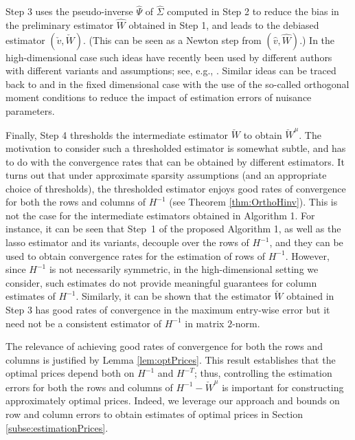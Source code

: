 \documentclass[opre,nonblindrev]{informs3} %
\begin{document}
{Step 3 uses the pseudo-inverse $\hat \Psi$ of $\hat\Sigma$ computed in Step 2 to reduce the bias in the preliminary estimator $\hat W$ obtained in Step 1, and leads to the debiased estimator $(\check v,\check W)$. (This can be seen as a Newton step from $(\hat v,\hat W)$.)  In the high-dimensional case such ideas have recently been  used by different authors with different variants and assumptions; see, e.g., \cite{BelloniChernozhukovHansen2011,c.h.zhang:s.zhang,GRD2014,javanmard2014confidence,BCK-LAD}. Similar ideas can be traced back to \cite{neyman1965use} and \cite{Neyman1979} in the fixed dimensional case with the use of the so-called orthogonal moment conditions to reduce the impact of estimation errors of nuisance parameters.

Finally, Step 4 thresholds the intermediate estimator $\check W$ to obtain $\check W^\mu$. 
The motivation to consider such a thresholded estimator is somewhat subtle,
and has to do with the convergence rates that can be obtained by different estimators.
It turns out that under approximate sparsity assumptions (and an appropriate choice of thresholds), the thresholded estimator  enjoys good rates of convergence for both the rows and columns of $H^{-1}$ (see Theorem \ref{thm:OrthoHinv}).
This is not the case for the intermediate estimators obtained in Algorithm 1.
For instance, it can be seen that Step~1 of the proposed Algorithm 1, as well as the lasso estimator and its variants, decouple over the rows of $H^{-1}$, and they can be used to obtain convergence rates for the estimation of rows of $H^{-1}$.	
However, since $H^{-1}$ is not necessarily symmetric, in the high-dimensional setting we consider, such estimates do not provide meaningful guarantees  for  column estimates of $H^{-1}$.
Similarly, 
it can be shown that
the 	
 estimator $\check W$ obtained in Step 3 has good rates 
 of convergence in the maximum entry-wise error but it 
 need not be a consistent estimator of $H^{-1}$ in matrix $2$-norm.




The relevance of achieving good rates of convergence for both the rows and columns is justified by Lemma \ref{lem:optPrices}. 
This result establishes that the optimal prices depend both on $H^{-1}$ and $H^{-T}$; thus, controlling the estimation errors for both the rows and columns of	$H^{-1}-\check{W}^\mu$ is important 
for constructing
approximately optimal prices. Indeed, we leverage our approach and bounds on 
row and column errors
to obtain estimates of optimal prices in Section \ref{subse:estimationPrices}.}
\end{document}

